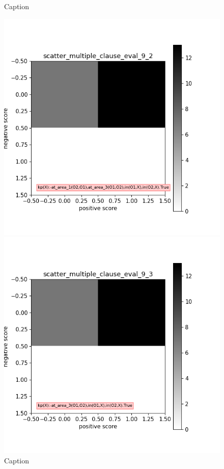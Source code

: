 \documentclass[
]{ceurart}
\begin{document}
\begin{figure}[h]
\begin{minipage}{.3\textwidth}
		\caption{Caption}\label{label-b}
	\end{minipage}
	\begin{minipage}{.3\textwidth}
		\includegraphics[width=\textwidth]{img/mce/mce-2.png}
		\caption{Caption}\label{label-c}
	\end{minipage}
	\begin{minipage}[b]{.3\textwidth}
		\includegraphics[width=\textwidth]{img/mce/mce-3.png}

\end{minipage}
\end{figure}
\end{document}
